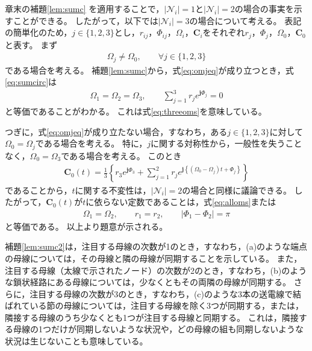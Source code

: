 \documentclass[tombow,dvipdfmx]{corona-a5-1.1}
\begin{document}
\begin{証明}
章末の補題\ref{lem:sumc}
を適用することで，$|\mathcal{N}_i|=1$と$|\mathcal{N}_i|=2$の場合の事実を示すことができる。
したがって，以下では$|\mathcal{N}_i|=3$の場合について考える。
表記の簡単化のため，$j \in\{1,2,3\}$とし，$r_{ij}$，$\Phi_{ij}$，$\Omega_i$，$\bm{C}_i$をそれぞれ$r_{j}$，$\Phi_{j}$，$\Omega_0$，$\bm{C}_0$と表す。
まず
\begin{align}\label{eq:omjeq}
\Omega_j \neq \Omega_0
,\qquad \forall j \in \{1,2,3\}
\end{align}
である場合を考える。
補題\ref{lem:sumc}から，式\ref{eq:omjeq}が成り立つとき，式\ref{eq:sumcirc}は
\begin{align*}
\Omega_1 = \Omega_2 = \Omega_3,\qquad
\sum_{j=1}^3 
r_j e^{\bm{j} \Phi_j}=0
\end{align*}
と等価であることがわかる。
これは式\ref{eq:threeoms}を意味している。

つぎに，式\ref{eq:omjeq}が成り立たない場合，すなわち，ある$j\in\{1,2,3\}$に対して$\Omega_0=\Omega_j$である場合を考える。
特に，$j$に関する対称性から，一般性を失うことなく，$\Omega_0=\Omega_3$である場合を考える。
このとき
\begin{align*}
\bm{C}_0 (t) = \frac{1}{3} \left\{
r_3 e^{\bm{j} \Phi_3}
+
\sum_{j=1}^2
r_{j}
e^{\bm{j} 
\left\{
(\Omega_0 - \Omega_j)t + 
\Phi_{j}
\right\} }
\right\}
\end{align*}
であることから，$t$に関する不変性は，$|\mathcal{N}_i|=2$の場合と同様に議論できる。
したがって，$\bm{C}_0 (t)$が$t$に依らない定数であることは，式\ref{eq:alloms}または
\begin{align*}
\Omega_{1} = \Omega_{2}
,\qquad
r_{1} = r_{2}
,\qquad
|\Phi_{1}-\Phi_{2}| = \pi
\end{align*}
と等価である。
以上より題意が示される。
\end{証明}

補題\ref{lem:sumc2}は，注目する母線の次数が1のとき，すなわち，(a)のような端点の母線については，その母線と隣の母線が同期することを示している。
また，注目する母線（太線で示されたノード）の次数が2のとき，すなわち，(b)のような鎖状経路にある母線については，少なくともその両隣の母線が同期する。
さらに，注目する母線の次数が3のとき，すなわち，(c)のような3本の送電線で結ばれている節の母線については，注目する母線を除く3つが同期する，または，隣接する母線のうち少なくとも1つが注目する母線と同期する。
これは，隣接する母線の1つだけが同期しないような状況や，どの母線の組も同期しないような状況は生じないことも意味している。
\end{document}
